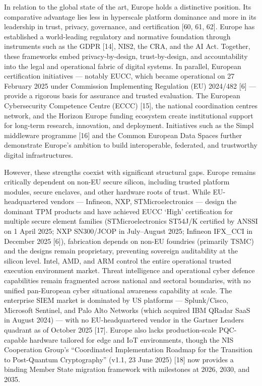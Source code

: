 \documentclass{ieeeaccess}
\begin{document}
In relation to the global state of the art, Europe holds a distinctive
position. Its comparative advantage lies less in hyperscale platform
dominance and more in its leadership in trust, privacy, governance, and
certification {[}60, 61, 62{]}. Europe has established a world-leading
regulatory and normative foundation through instruments such as the GDPR
{[}14{]}, NIS2, the CRA, and the AI Act. Together, these frameworks
embed privacy-by-design, trust-by-design, and accountability into the
legal and operational fabric of digital systems. In parallel, European
certification initiatives --- notably EUCC, which became operational on
27 February 2025 under Commission Implementing Regulation (EU) 2024/482
{[}6{]} --- provide a rigorous basis for assurance and trusted
evaluation. The European Cybersecurity Competence Centre (ECCC)
{[}15{]}, the national coordination centres network, and the Horizon
Europe funding ecosystem create institutional support for long-term
research, innovation, and deployment. Initiatives such as the Simpl
middleware programme {[}16{]} and the Common European Data Spaces
further demonstrate Europe's ambition to build interoperable, federated,
and trustworthy digital infrastructures.

However, these strengths coexist with significant structural gaps.
Europe remains critically dependent on non-EU secure silicon, including
trusted platform modules, secure enclaves, and other hardware roots of
trust. While EU-headquartered vendors --- Infineon, NXP,
STMicroelectronics --- design the dominant TPM products and have
achieved EUCC `High' certification for multiple secure element families
(STMicroelectronics ST54J/K certified by ANSSI on 1 April 2025; NXP
SN300/JCOP in July--August 2025; Infineon IFX\_CCI in December 2025
{[}6{]}), fabrication depends on non-EU foundries (primarily TSMC) and
the designs remain proprietary, preventing sovereign auditability at the
silicon level. Intel, AMD, and ARM control the entire operational
trusted execution environment market. Threat intelligence and
operational cyber defence capabilities remain fragmented across national
and sectoral boundaries, with no unified pan-European cyber situational
awareness capability at scale. The enterprise SIEM market is dominated
by US platforms --- Splunk/Cisco, Microsoft Sentinel, and Palo Alto
Networks (which acquired IBM QRadar SaaS in August 2024) --- with no
EU-headquartered vendor in the Gartner Leaders quadrant as of October
2025 {[}17{]}. Europe also lacks production-scale PQC-capable hardware
tailored for edge and IoT environments, though the NIS Cooperation
Group's ``Coordinated Implementation Roadmap for the Transition to
Post-Quantum Cryptography'' (v1.1, 23 June 2025) {[}18{]} now provides a
binding Member State migration framework with milestones at 2026, 2030,
and 2035.
\end{document}
